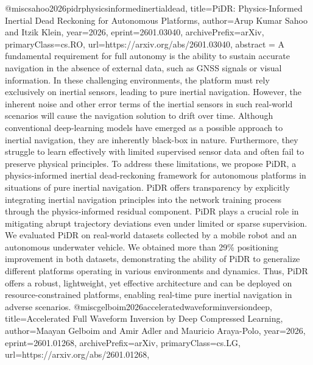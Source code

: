 {}@misc{sahoo2026pidrphysicsinformedinertialdead,
      title={PiDR: Physics-Informed Inertial Dead Reckoning for Autonomous Platforms}, 
      author={Arup Kumar Sahoo and Itzik Klein},
      year={2026},
      eprint={2601.03040},
      archivePrefix={arXiv},
      primaryClass={cs.RO},
      url={https://arxiv.org/abs/2601.03040},
      abstract = {A fundamental requirement for full autonomy is the ability to sustain accurate navigation in the absence of external data, such as GNSS signals or visual information. In these challenging environments, the platform must rely exclusively on inertial sensors, leading to pure inertial navigation. However, the inherent noise and other error terms of the inertial sensors in such real-world scenarios will cause the navigation solution to drift over time. Although conventional deep-learning models have emerged as a possible approach to inertial navigation, they are inherently black-box in nature. Furthermore, they struggle to learn effectively with limited supervised sensor data and often fail to preserve physical principles. To address these limitations, we propose PiDR, a physics-informed inertial dead-reckoning framework for autonomous platforms in situations of pure inertial navigation. PiDR offers transparency by explicitly integrating inertial navigation principles into the network training process through the physics-informed residual component. PiDR plays a crucial role in mitigating abrupt trajectory deviations even under limited or sparse supervision. We evaluated PiDR on real-world datasets collected by a mobile robot and an autonomous underwater vehicle. We obtained more than 29\% positioning improvement in both datasets, demonstrating the ability of PiDR to generalize different platforms operating in various environments and dynamics. Thus, PiDR offers a robust, lightweight, yet effective architecture and can be deployed on resource-constrained platforms, enabling real-time pure inertial navigation in adverse scenarios.}
}@misc{gelboim2026acceleratedwaveforminversiondeep,
      title={Accelerated Full Waveform Inversion by Deep Compressed Learning}, 
      author={Maayan Gelboim and Amir Adler and Mauricio Araya-Polo},
      year={2026},
      eprint={2601.01268},
      archivePrefix={arXiv},
      primaryClass={cs.LG},
      url={https://arxiv.org/abs/2601.01268},
}
